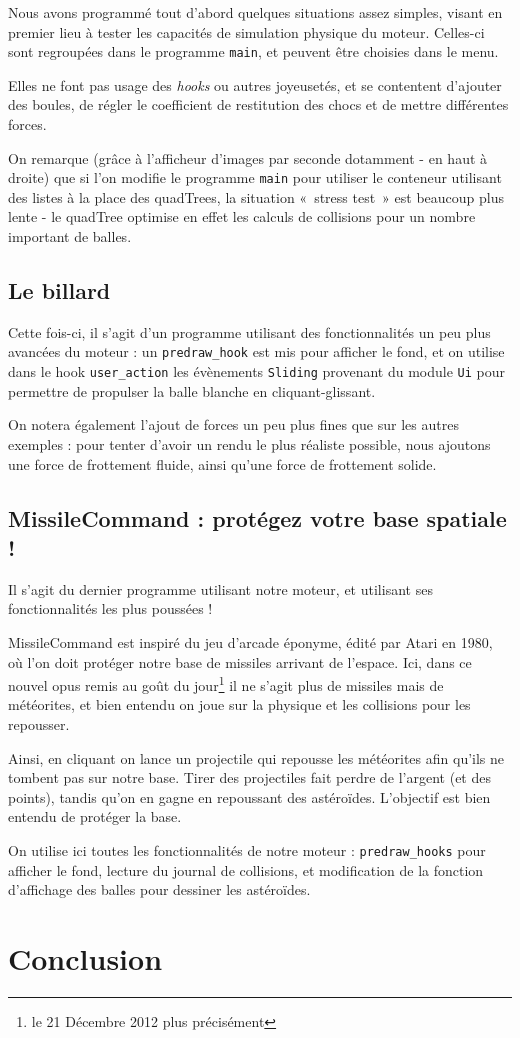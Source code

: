 \documentclass[a4paper]{scrartcl}
\begin{document}
Nous avons programmé tout d'abord quelques situations assez simples,
visant en premier lieu à tester les capacités de simulation physique
du moteur. Celles-ci sont regroupées dans le programme \texttt{main},
et peuvent être choisies dans le menu.

Elles ne font pas usage des \emph{hooks} ou autres joyeusetés, et se
contentent d'ajouter des boules, de régler le coefficient de
restitution des chocs et de mettre différentes forces.

On remarque (grâce à l'afficheur d'images par seconde dotamment - en
haut à droite) que si l'on modifie le programme \texttt{main} pour
utiliser le conteneur utilisant des listes à la place des quadTrees,
la situation «~stress test~» est beaucoup plus lente - le quadTree
optimise en effet les calculs de collisions pour un nombre important
de balles.

\subsection{Le billard}

Cette fois-ci, il s'agit d'un programme utilisant des fonctionnalités
un peu plus avancées du moteur : un \texttt{predraw\_hook} est mis
pour afficher le fond, et on utilise dans le hook
\texttt{user\_action} les évènements \texttt{Sliding} provenant du
module \texttt{Ui} pour permettre de propulser la balle blanche en
cliquant-glissant.

On notera également l'ajout de forces un peu plus fines que sur les
autres exemples : pour tenter d'avoir un rendu le plus réaliste
possible, nous ajoutons une force de frottement fluide, ainsi qu'une
force de frottement solide.

\subsection{MissileCommand : protégez votre base spatiale !}

Il s'agit du dernier programme utilisant notre moteur, et utilisant
ses fonctionnalités les plus poussées !

MissileCommand est inspiré du jeu d'arcade éponyme, édité par Atari en
1980, où l'on doit protéger notre base de missiles arrivant de
l'espace. Ici, dans ce nouvel opus remis au goût du jour\footnote{le
  21 Décembre 2012 plus précisément} il ne s'agit plus de missiles
mais de météorites, et bien entendu on joue sur la physique et les
collisions pour les repousser.

Ainsi, en cliquant on lance un projectile qui repousse les météorites
afin qu'ils ne tombent pas sur notre base. Tirer des projectiles fait
perdre de l'argent (et des points), tandis qu'on en gagne en
repoussant des astéroïdes. L'objectif est bien entendu de protéger la
base.

On utilise ici toutes les fonctionnalités de notre moteur :
\texttt{predraw\_hooks} pour afficher le fond, lecture du journal de
collisions, et modification de la fonction d'affichage des balles pour
dessiner les astéroïdes.

\section*{Conclusion}
\end{document}
